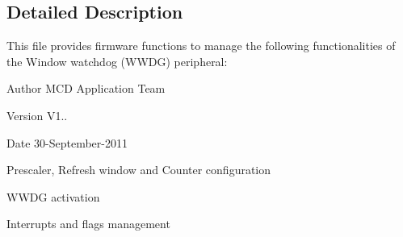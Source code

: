 \subsection{Detailed Description}
This file provides firmware functions to manage the following functionalities of the Window watchdog (W\+W\+DG) peripheral\+: 

\begin{DoxyAuthor}{Author}
M\+CD Application Team 
\end{DoxyAuthor}
\begin{DoxyVersion}{Version}
V1.. 
\end{DoxyVersion}
\begin{DoxyDate}{Date}
30-\/\+September-\/2011
\begin{DoxyItemize}
\item Prescaler, Refresh window and Counter configuration
\item W\+W\+DG activation
\item Interrupts and flags management
\end{DoxyItemize}
\end{DoxyDate}
